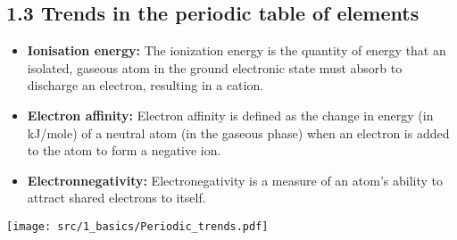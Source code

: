 \subsection{1.3 Trends in the periodic table of elements}
	\begin{itemize}
		\itemsep0em
    	\item \textbf{Ionisation energy: }The ionization energy is the quantity of energy that an isolated, gaseous atom in the ground electronic state must absorb to discharge an electron, resulting in a cation.
    	\item \textbf{Electron affinity: }Electron affinity is defined as the change in energy (in kJ/mole) of a neutral atom (in the gaseous phase) when an electron is added to the atom to form a negative ion.
    	\item \textbf{Electronnegativity:} Electronegativity is a measure of an atom's ability to attract shared electrons to itself.
	\end{itemize}
	\centerline{\texttt{[image: src/1\_basics/Periodic\_trends.pdf]}}
	\vspace*{0.5em}